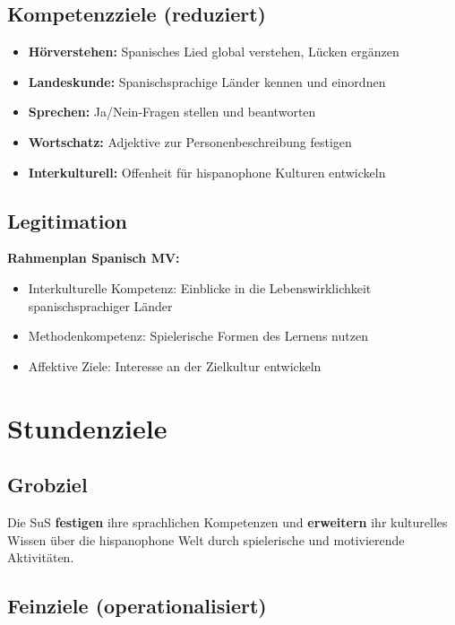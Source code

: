 \documentclass[11pt,a4paper]{article}
\begin{document}
\subsection{Kompetenzziele (reduziert)}

\begin{itemize}
    \item \textbf{Hörverstehen:} Spanisches Lied global verstehen, Lücken ergänzen
    \item \textbf{Landeskunde:} Spanischsprachige Länder kennen und einordnen
    \item \textbf{Sprechen:} Ja/Nein-Fragen stellen und beantworten
    \item \textbf{Wortschatz:} Adjektive zur Personenbeschreibung festigen
    \item \textbf{Interkulturell:} Offenheit für hispanophone Kulturen entwickeln
\end{itemize}

\subsection{Legitimation}

\textbf{Rahmenplan Spanisch MV:}
\begin{itemize}
    \item Interkulturelle Kompetenz: \glqq{}Einblicke in die Lebenswirklichkeit spanischsprachiger Länder\grqq{}
    \item Methodenkompetenz: \glqq{}Spielerische Formen des Lernens nutzen\grqq{}
    \item Affektive Ziele: \glqq{}Interesse an der Zielkultur entwickeln\grqq{}
\end{itemize}

\section{Stundenziele}

\subsection{Grobziel}
Die SuS \textbf{festigen} ihre sprachlichen Kompetenzen und \textbf{erweitern} ihr kulturelles Wissen über die hispanophone Welt durch spielerische und motivierende Aktivitäten.

\subsection{Feinziele (operationalisiert)}
\end{document}

